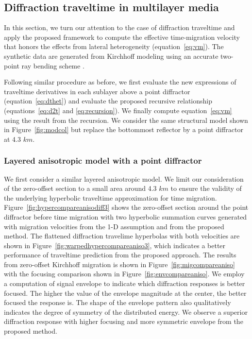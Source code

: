 
\subsection{Diffraction traveltime in multilayer media}
In this section, we turn our attention to the case of diffraction traveltime and apply the proposed framework to compute the effective time-migration velocity that honors the effects from lateral heterogeneity (equation~\ref{eq:vm}). The synthetic data are generated from Kirchhoff modeling using an accurate two-point ray bending scheme \cite[]{zonetwopoint}.

Following similar procedure as before, we first evaluate the new expressions of traveltime derivatives in each sublayer above a point diffractor (equation~\ref{eq:dthet}) and evaluate the proposed recursive relationship (equations~\ref{eq:d2t} and \ref{eq:recursion}). We finally compute equation~\ref{eq:vm} using the result from the recursion. We consider the same structural model shown in Figure~\ref{fig:modcol} but replace the bottommost reflector by a point diffractor at 4.3 $km$.


\subsubsection{Layered anisotropic model with a point diffractor}

We first consider a similar layered anisotropic model. We limit our consideration of the zero-offset section to a small area around 4.3 $km$ to ensure the validity of the underlying hyperbolic traveltime approximation for time migration. Figure~\ref{fig:hypercompareanisodiff3} shows the zero-offset section around the point diffractor before time migration with two hyperbolic summation curves generated with migration velocities from the 1-D assumption and from the proposed method. The flattened diffraction travelime hyperbolas with both velocities are shown in Figure~\ref{fig:warpedhypercompareaniso3}, which indicates a better performance of traveltime prediction from the proposed approach. The results from zero-offset Kirchhoff migration is shown in Figure~\ref{fig:migcompareaniso} with the focusing comparison shown in Figure~\ref{fig:envcompareaniso}. We employ a computation of signal envelope to indicate which diffraction responses is better focused. The higher the value of the envelope magnitude at the center, the better focused the response is. The shape of the envelope pattern also qualitatively indicates the degree of symmetry of the distributed energy. We observe a superior diffraction response with higher focusing and more symmetric envelope from the proposed method.

